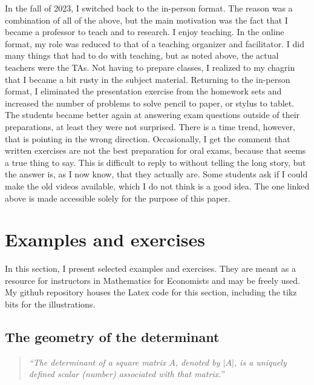 \documentclass[graybox]{svmult}
\begin{document}
In the fall of 2023, I switched back to the in-person format. The reason was a combination of all of the above, but the main motivation was the fact that I became a professor to teach and to research. I enjoy teaching. In the online format, my role was reduced to that of a teaching organizer and facilitator. I did many things that had to do with teaching, but as noted above, the actual teachers were the TAs. Not having to prepare classes, I realized to my chagrin that I became a bit rusty in the subject material. Returning to the in-person format, I eliminated the presentation exercise from the homework sets and increased the number of problems to solve pencil to paper, or stylus to tablet. The students became better again at answering exam questions outside of their preparations, at least they were not surprised. There is a time trend, however, that is pointing in the wrong direction. Occasionally, I get the comment that written exercises are not the best preparation for oral exams, because that seems a true thing to say. This is difficult to reply to without telling the long story, but the answer is, as I now know, that they actually are.  Some students ask if I could make the old videos available, which I do not think is a good idea. The one linked above is made accessible solely for the purpose of this paper.





\section{Examples and exercises}

In this section, I present selected examples and exercises. They are meant as a resource for instructors in Mathematics for Economists and may be freely used. My github repository houses the Latex code for this section, including the tikz bits for the illustrations.

\subsection{The geometry of the determinant}

\begin{quote}\it
``The determinant of a square matrix $A$, denoted by $|A|$, is a uniquely defined scalar (number) associated with that matrix.'' \citep[p. 93]{Chiang1984}
\end{quote}

\smallskip
\end{document}
